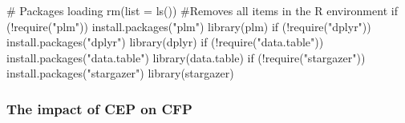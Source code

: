 \documentclass[12pt,]{article}
\newenvironment{Shaded}{}{}
\newcommand{\KeywordTok}[1]{\textcolor[rgb]{0.00,0.00,1.00}{#1}}
\newcommand{\DataTypeTok}[1]{#1}
\newcommand{\StringTok}[1]{\textcolor[rgb]{0.00,0.50,0.50}{#1}}
\newcommand{\CommentTok}[1]{\textcolor[rgb]{0.00,0.50,0.00}{#1}}
\newcommand{\ControlFlowTok}[1]{\textcolor[rgb]{0.00,0.00,1.00}{#1}}
\newcommand{\OperatorTok}[1]{#1}
\newcommand{\NormalTok}[1]{#1}
\begin{document}
\begin{Shaded}
\begin{Highlighting}[]
\CommentTok{# Packages loading}
\KeywordTok{rm}\NormalTok{(}\DataTypeTok{list =} \KeywordTok{ls}\NormalTok{())  }\CommentTok{#Removes all items in the R environment}
\ControlFlowTok{if}\NormalTok{ (}\OperatorTok{!}\KeywordTok{require}\NormalTok{(}\StringTok{"plm"}\NormalTok{)) }\KeywordTok{install.packages}\NormalTok{(}\StringTok{"plm"}\NormalTok{)}
\KeywordTok{library}\NormalTok{(plm)}
\ControlFlowTok{if}\NormalTok{ (}\OperatorTok{!}\KeywordTok{require}\NormalTok{(}\StringTok{"dplyr"}\NormalTok{)) }\KeywordTok{install.packages}\NormalTok{(}\StringTok{"dplyr"}\NormalTok{)}
\KeywordTok{library}\NormalTok{(dplyr)}
\ControlFlowTok{if}\NormalTok{ (}\OperatorTok{!}\KeywordTok{require}\NormalTok{(}\StringTok{"data.table"}\NormalTok{)) }\KeywordTok{install.packages}\NormalTok{(}\StringTok{"data.table"}\NormalTok{)}
\KeywordTok{library}\NormalTok{(data.table)}
\ControlFlowTok{if}\NormalTok{ (}\OperatorTok{!}\KeywordTok{require}\NormalTok{(}\StringTok{"stargazer"}\NormalTok{)) }\KeywordTok{install.packages}\NormalTok{(}\StringTok{"stargazer"}\NormalTok{)}
\KeywordTok{library}\NormalTok{(stargazer)}
\end{Highlighting}
\end{Shaded}

\hypertarget{the-impact-of-cep-on-cfp-2}{\subsubsection*{The impact of
CEP on CFP}\label{the-impact-of-cep-on-cfp-2}}
\end{document}

